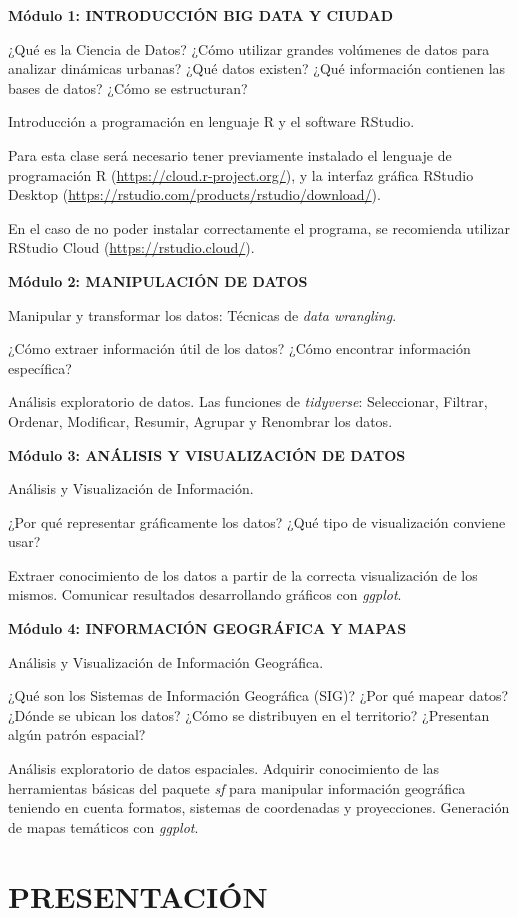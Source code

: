 \documentclass[
  spanish,
]{book}
\begin{document}
\textbf{Módulo 1: INTRODUCCIÓN BIG DATA Y CIUDAD}

¿Qué es la Ciencia de Datos? ¿Cómo utilizar grandes volúmenes de datos para analizar dinámicas urbanas? ¿Qué datos existen? ¿Qué información contienen las bases de datos? ¿Cómo se estructuran?

Introducción a programación en lenguaje R y el software RStudio.

Para esta clase será necesario tener previamente instalado el lenguaje de programación R (\url{https://cloud.r-project.org/}), y la interfaz gráfica RStudio Desktop (\url{https://rstudio.com/products/rstudio/download/}).

En el caso de no poder instalar correctamente el programa, se recomienda utilizar RStudio Cloud (\url{https://rstudio.cloud/}).

\textbf{Módulo 2: MANIPULACIÓN DE DATOS}

Manipular y transformar los datos: Técnicas de \emph{data wrangling}.

¿Cómo extraer información útil de los datos? ¿Cómo encontrar información específica?

Análisis exploratorio de datos. Las funciones de \emph{tidyverse}: Seleccionar, Filtrar, Ordenar, Modificar, Resumir, Agrupar y Renombrar los datos.

\textbf{Módulo 3: ANÁLISIS Y VISUALIZACIÓN DE DATOS}

Análisis y Visualización de Información.

¿Por qué representar gráficamente los datos? ¿Qué tipo de visualización conviene usar?

Extraer conocimiento de los datos a partir de la correcta visualización de los mismos. Comunicar resultados desarrollando gráficos con \emph{ggplot}.

\textbf{Módulo 4: INFORMACIÓN GEOGRÁFICA Y MAPAS}

Análisis y Visualización de Información Geográfica.

¿Qué son los Sistemas de Información Geográfica (SIG)? ¿Por qué mapear datos?
¿Dónde se ubican los datos? ¿Cómo se distribuyen en el territorio? ¿Presentan algún patrón espacial?

Análisis exploratorio de datos espaciales. Adquirir conocimiento de las herramientas básicas del paquete \emph{sf} para manipular información geográfica teniendo en cuenta formatos, sistemas de coordenadas y proyecciones. Generación de mapas temáticos con \emph{ggplot}.

\hypertarget{presentaciuxf3n}{%
\chapter{PRESENTACIÓN}\label{presentaciuxf3n}}
\end{document}
